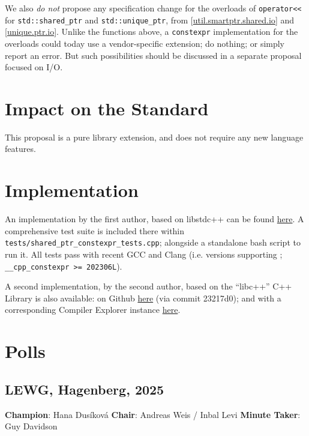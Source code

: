 \documentclass[10pt]{article}
\newcommand*{\wgxxi}[1]{[\href{https://wg21.link/#1}{#1}]}
\begin{document}
We also \emph{do not} propose any specification change for the overloads of
\texttt{operator<}\texttt{<} for \texttt{std::shared\_ptr} and
\texttt{std::unique\_ptr}, from \wgxxi{util.smartptr.shared.io} and
\wgxxi{unique.ptr.io}. Unlike the functions above, a \texttt{constexpr}
implementation for the overloads could today use a vendor-specific extension;
do nothing; or simply report an error. But such possibilities should be
discussed in a separate proposal focused on I/O.

\section{Impact on the Standard}

This proposal is a pure library extension, and does not require any new
language features.

\section{Implementation}

An implementation by the first author, based on libstdc++
can be found \href{https://github.com/SCT4SP/constexpr_shared_ptr}{here}. A
comprehensive test suite is included there within
\texttt{tests/shared\_ptr\_constexpr\_tests.cpp}; alongside a standalone bash
script to run it. All tests pass with recent GCC and Clang (i.e. versions
supporting \cite{P2738R1}; \texttt{\_\_cpp\_constexpr >= 202306L}).

A second implementation, by the second author, based on the ``libc++'' C++
Library is also available: on Github
\href{https://github.com/hanickadot/llvm-project/tree/P3309-constexpr-atomic-and-atomic-ref}{here}
(via commit 23217d0); and with a corresponding Compiler Explorer instance
\href{https://compiler-explorer.com/z/8cj7nc1no}{here}.

\section{Polls}

\subsection{LEWG, Hagenberg, 2025}

\textbf{Champion}: Hana Dusíková\newline
\textbf{Chair}: Andreas Weis / Inbal Levi\newline
\textbf{Minute Taker}: Guy Davidson\newline
\end{document}
